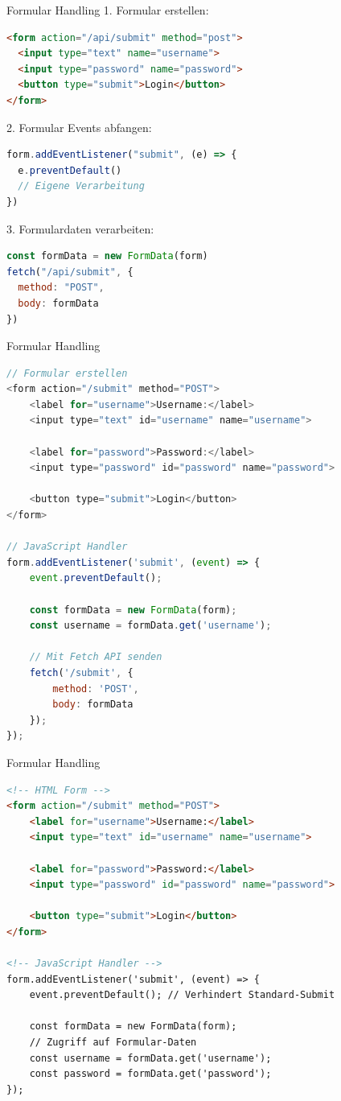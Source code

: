 \begin{KR}{Formular Handling}
1. Formular erstellen:
\begin{lstlisting}[language=HTML, style=basesmol]
<form action="/api/submit" method="post">
  <input type="text" name="username">
  <input type="password" name="password">
  <button type="submit">Login</button>
</form>
\end{lstlisting}

2. Formular Events abfangen:
\begin{lstlisting}[language=JavaScript, style=basesmol]
form.addEventListener("submit", (e) => {
  e.preventDefault() 
  // Eigene Verarbeitung
})
\end{lstlisting}

3. Formulardaten verarbeiten:
\begin{lstlisting}[language=JavaScript, style=basesmol]
const formData = new FormData(form)
fetch("/api/submit", {
  method: "POST",
  body: formData
})
\end{lstlisting}
\end{KR}

\begin{KR}{Formular Handling}
\begin{lstlisting}[language=JavaScript, style=basesmol]
// Formular erstellen
<form action="/submit" method="POST">
    <label for="username">Username:</label>
    <input type="text" id="username" name="username">
    
    <label for="password">Password:</label>
    <input type="password" id="password" name="password">
    
    <button type="submit">Login</button>
</form>

// JavaScript Handler
form.addEventListener('submit', (event) => {
    event.preventDefault();
    
    const formData = new FormData(form);
    const username = formData.get('username');
    
    // Mit Fetch API senden
    fetch('/submit', {
        method: 'POST',
        body: formData
    });
});
\end{lstlisting}
\end{KR}

\begin{KR}{Formular Handling}
\begin{lstlisting}[language=HTML, style=basesmol]
<!-- HTML Form -->
<form action="/submit" method="POST">
    <label for="username">Username:</label>
    <input type="text" id="username" name="username">
    
    <label for="password">Password:</label>
    <input type="password" id="password" name="password">
    
    <button type="submit">Login</button>
</form>

<!-- JavaScript Handler -->
form.addEventListener('submit', (event) => {
    event.preventDefault(); // Verhindert Standard-Submit
    
    const formData = new FormData(form);
    // Zugriff auf Formular-Daten
    const username = formData.get('username');
    const password = formData.get('password');
});
\end{lstlisting}
\end{KR}

